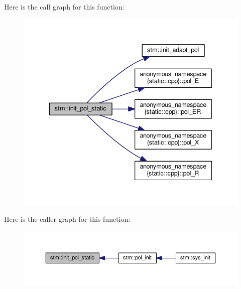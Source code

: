 Here is the call graph for this function\-:
\nopagebreak
\begin{figure}[H]
\begin{center}
\leavevmode
\includegraphics[width=338pt]{namespacestm_ab5a1851d6381fc50697f662635db22ea_cgraph}
\end{center}
\end{figure}




Here is the caller graph for this function\-:
\nopagebreak
\begin{figure}[H]
\begin{center}
\leavevmode
\includegraphics[width=350pt]{namespacestm_ab5a1851d6381fc50697f662635db22ea_icgraph}
\end{center}
\end{figure}


